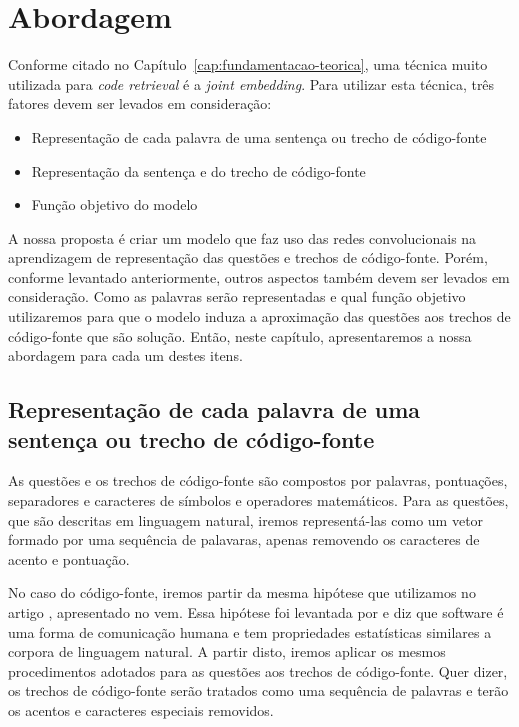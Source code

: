 \chapter{Abordagem}
\label{cap:abordagem}

Conforme citado no Capítulo~\ref{cap:fundamentacao-teorica}, uma técnica muito utilizada para \textit{code retrieval} é a \textit{joint embedding}. Para utilizar esta técnica, três fatores devem ser levados em consideração:

\begin{itemize}
    \item Representação de cada palavra de uma sentença ou trecho de código-fonte
    \item Representação da sentença e do trecho de código-fonte
    \item Função objetivo do modelo
\end{itemize}

A nossa proposta é criar um modelo que faz uso das redes convolucionais na aprendizagem de representação das questões e trechos de código-fonte. Porém, conforme levantado anteriormente, outros aspectos também devem ser levados em consideração. Como as palavras serão representadas e qual função objetivo utilizaremos para que o modelo induza a aproximação das questões aos trechos de código-fonte que são solução. Então, neste capítulo, apresentaremos a nossa abordagem para cada um destes itens.

\section{Representação de cada palavra de uma sentença ou trecho de código-fonte}
\label{sec:abordagem-representacao-token}

As questões e os trechos de código-fonte são compostos por palavras, pontuações, separadores e caracteres de símbolos e operadores matemáticos. Para as questões, que são descritas em linguagem natural, iremos representá-las como um vetor formado por uma sequência de palavaras, apenas removendo os caracteres de acento e pontuação.

No caso do código-fonte, iremos partir da  mesma hipótese que utilizamos no artigo \cite{marcelo-vem-2019}, apresentado no \acrfull{vem}. Essa hipótese foi levantada por \cite{Allamanis:2018:SML} e diz que software é uma forma de comunicação humana e tem propriedades estatísticas similares a corpora de linguagem natural. A partir disto, iremos aplicar os mesmos procedimentos adotados para as questões aos trechos de código-fonte. Quer dizer, os trechos de código-fonte serão tratados como uma sequência de palavras e terão os acentos e caracteres especiais removidos.

